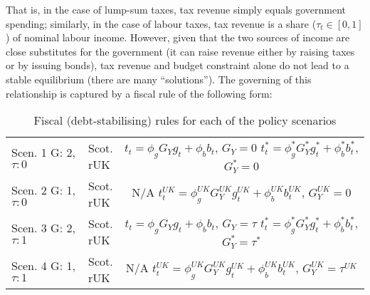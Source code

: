 That is, in the case of lump-sum taxes, tax revenue simply equals government spending; similarly, in the case of labour taxes, tax revenue is a share ($ \tau_t \in [0,1]$) of nominal labour income. However, given that the two sources of income are close substitutes for the government (it can raise revenue either by raising taxes or by issuing bonds), tax revenue and budget constraint alone do not lead to a stable equilibrium (there are many ``solutions''). The governing of this relationship is captured by a fiscal rule of the following form:
\begin{table}[H]
    \renewcommand{\arraystretch}{2}
    \centering
    \begin{tabular}{l|l|c}
    \makecell{Scen. 1 \\ G: 2, $\tau: 0$} & \makecell{Scot. \\ rUK } & 
        \makecell{
            $t_t = \phi_g G_Y g_t + \phi_b b_t$, \quad $G_Y = 0$\\
            $t^*_t = \phi^*_g G^*_Y g^*_t + \phi^*_b b^*_t$, \quad $G^*_Y = 0$\\
        }  \\ 
    \makecell{Scen. 2 \\ G: 1, $\tau: 0$} & \makecell{Scot. \\ rUK } & 
        \makecell{
            N/A\\
            $t^{UK}_t = \phi^{UK}_g G^{UK}_Y g^{UK}_t + \phi^{UK}_b b^{UK}_t$, \quad $G^{UK}_Y = 0$\\
        }   \\ 
    \makecell{Scen. 3 \\ G: 2, $\tau: 1$} & \makecell{Scot. \\ rUK } & 
    \makecell{
        $t_t = \phi_g G_Y g_t + \phi_b b_t$, \quad $G_Y = \tau$\\
        $t^*_t = \phi^*_g G^*_Y g^*_t + \phi^*_b b^*_t$, \quad $G^*_Y = \tau^*$\\
}  \\
    \makecell{Scen. 4 \\ G: 1, $\tau: 1$} & \makecell{Scot. \\ rUK } & 
    \makecell{
        N/A \\
        $t^{UK}_t = \phi^{UK}_g G^{UK}_Y g^{UK}_t + \phi^{UK}_b b^{UK}_t$, \quad $G^{UK}_Y = \tau^{UK}$\\
        }  
    \end{tabular}
    \caption{Fiscal (debt-stabilising) rules for each of the policy scenarios}
\end{table}
